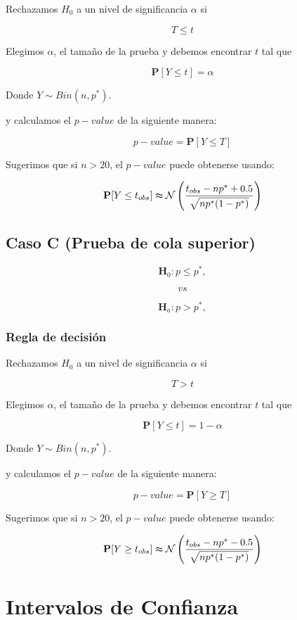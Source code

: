 \documentclass[
  a4paper,
  oneside,
  openany]{book}
\begin{document}
Rechazamos \(H_0\) a un nivel de significancia \(\alpha\) si

\[T \leq t\]

Elegimos \(\alpha\), el tamaño de la prueba y debemos encontrar \(t\) tal que

\[\mathbf{P}[Y \leq t]=\alpha\]

Donde \(Y \sim Bin (n,p^*)\).

y calculamos el \(p-value\) de la siguiente manera:

\[p-value= \mathbf{P}[Y\leq T]\]

Sugerimos que si \(n > 20\), el \(p-value\) puede obtenerse usando:

\[\mathbf{P}[Y\leq t_{obs}] \thickapprox \mathcal{N} \left(\frac{t_{obs}-np^*+0.5}{\sqrt{np^*(1-p^*)}}\right)\]

\hypertarget{caso-c-prueba-de-cola-superior}{%
\subsection*{Caso C (Prueba de cola superior)}\label{caso-c-prueba-de-cola-superior}}


\[\textbf{H}_{0}: p  \leq p^*,\]

\[vs\]

\[\textbf{H}_{a}: p >p^*,\]

\hypertarget{regla-de-decisiuxf3n-2}{%
\subsubsection*{Regla de decisión}\label{regla-de-decisiuxf3n-2}}


Rechazamos \(H_0\) a un nivel de significancia \(\alpha\) si

\[T > t\]

Elegimos \(\alpha\), el tamaño de la prueba y debemos encontrar \(t\) tal que

\[\mathbf{P}[Y \leq t]=1-\alpha\]

Donde \(Y \sim Bin (n,p^*)\).

y calculamos el \(p-value\) de la siguiente manera:

\[p-value= \mathbf{P}[Y \geq T]\]

Sugerimos que si \(n > 20\), el \(p-value\) puede obtenerse usando:

\[\mathbf{P}[Y\geq t_{obs}] \thickapprox \mathcal{N} \left(\frac{t_{obs}-np^*-0.5}{\sqrt{np^*(1-p^*)}}\right)\]

\hypertarget{intervalos-de-confianza}{%
\section{Intervalos de Confianza}\label{intervalos-de-confianza}}
\end{document}
